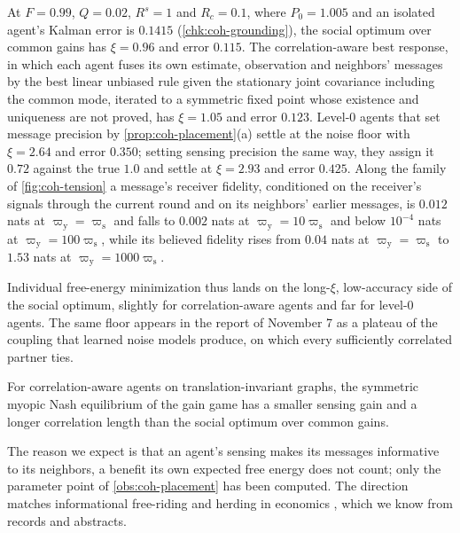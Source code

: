 \begin{observation}\label{obs:coh-placement}
At $F=0.99$, $Q=0.02$, $R^s=1$ and $R_c=0.1$, where $P_0=1.005$ and an isolated agent's Kalman error is $0.1415$ (\cref{chk:coh-grounding}), the social optimum over common gains has $\xi=0.96$ and error $0.115$. The correlation-aware best response, in which each agent fuses its own estimate, observation and neighbors' messages by the best linear unbiased rule given the stationary joint covariance including the common mode, iterated to a symmetric fixed point whose existence and uniqueness are not proved, has $\xi=1.05$ and error $0.123$. Level-0 agents that set message precision by \cref{prop:coh-placement}(a) settle at the noise floor with $\xi=2.64$ and error $0.350$; setting sensing precision the same way, they assign it $0.72$ against the true $1.0$ and settle at $\xi=2.93$ and error $0.425$. Along the family of \cref{fig:coh-tension} a message's receiver fidelity, conditioned on the receiver's signals through the current round and on its neighbors' earlier messages, is $0.012$ nats at $\varpi_{\mathrm y}=\varpi_{\mathrm s}$ and falls to $0.002$ nats at $\varpi_{\mathrm y}=10\varpi_{\mathrm s}$ and below $10^{-4}$ nats at $\varpi_{\mathrm y}=100\varpi_{\mathrm s}$, while its believed fidelity rises from $0.04$ nats at $\varpi_{\mathrm y}=\varpi_{\mathrm s}$ to $1.53$ nats at $\varpi_{\mathrm y}=1000\varpi_{\mathrm s}$.
\end{observation}

Individual free-energy minimization thus lands on the long-$\xi$, low-accuracy side of the social optimum, slightly for correlation-aware agents and far for level-0 agents. The same floor appears in the report of November 7 \citep{dennis2026communicating} as a plateau of the coupling that learned noise models produce, on which every sufficiently correlated partner ties.

\begin{conjecture}\label{conj:coh-externality}
For correlation-aware agents on translation-invariant graphs, the symmetric myopic Nash equilibrium of the gain game has a smaller sensing gain and a longer correlation length than the social optimum over common gains.
\end{conjecture}

The reason we expect is that an agent's sensing makes its messages informative to its neighbors, a benefit its own expected free energy does not count; only the parameter point of \cref{obs:coh-placement} has been computed. The direction matches informational free-riding and herding in economics \citep{banerjee1992simple,bikhchandani1992theory,galeotti2010law}, which we know from records and abstracts.

